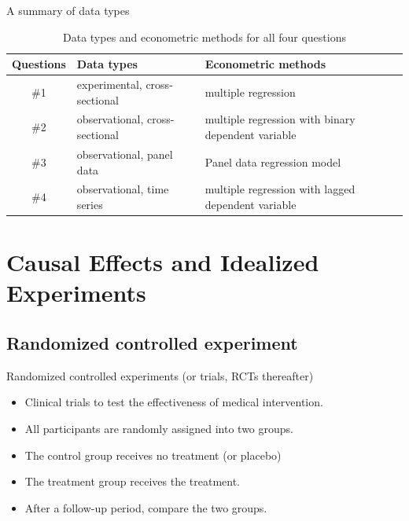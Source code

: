 \documentclass[presentation]{beamer}
\begin{document}
\begin{frame}[label={sec:org31b4265}]{A summary of data types}
\begin{table}[htbp]
\caption{\label{tab:org9040c10}
Data types and econometric methods for all four questions}
\centering
\footnotesize
\begin{tabular}{clp{5cm}}
Questions & Data types & Econometric methods\\
\hline
\#1 & experimental, cross-sectional & multiple regression\\
\#2 & observational, cross-sectional & multiple regression with binary dependent variable\\
\#3 & observational, panel data & Panel data regression model\\
\#4 & observational, time series & multiple regression with lagged dependent variable\\
\end{tabular}
\end{table}
\end{frame}


\section{Causal Effects and Idealized Experiments}
\label{sec:org3176805}
\setcounter{tocdepth}{1}
\tableofcontents[currentsection]

\subsection*{Randomized controlled experiment}
\label{sec:org0cb3305}

\begin{frame}[label={sec:orgb4b8f5f}]{Randomized controlled experiments (or trials, RCTs thereafter)}
\begin{itemize}
\item Clinical trials to test the effectiveness of medical
intervention.
\item All participants are \alert{randomly} assigned into two groups.
\item The control group receives no treatment (or placebo)
\item The treatment group receives the treatment.
\item After a follow-up period, compare the two groups.
\end{itemize}
\end{frame}
\end{document}
